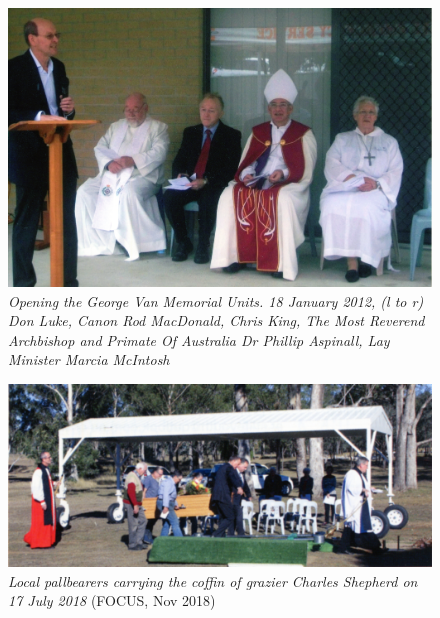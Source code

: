 \begin{figure}[!htb]
\begin{center}
\includegraphics[width=1.05\textwidth,center]{../images/openingGeorgeVannMemorialUnits.jpg}
\caption{\itshape Opening the George Van Memorial Units. 18 January 2012, (l to r) Don Luke, Canon Rod MacDonald, Chris King, The Most Reverend Archbishop and Primate Of Australia Dr Phillip Aspinall, Lay Minister Marcia McIntosh}
\end{center}
\end{figure}










\begin{figure}[!htb]
\begin{center}
\includegraphics[width=1.05\textwidth,center]{../images/charlesShepherd.jpg}
\caption{{\itshape Local pallbearers carrying the coffin of grazier Charles Shepherd on 17 July 2018} {\scriptsize(FOCUS, Nov 2018)}}
\end{center}
\end{figure}




